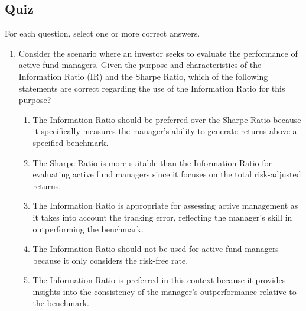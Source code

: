 \documentclass{article}
\begin{document}
\subsection{Quiz}
For each question, select one or more correct answers.

\begin{enumerate}
    \item Consider the scenario where an investor seeks to evaluate the performance of active fund managers. Given the purpose and characteristics of the Information Ratio (IR) and the Sharpe Ratio, which of the following statements are correct regarding the use of the Information Ratio for this purpose?
    \begin{enumerate}
        \item The Information Ratio should be preferred over the Sharpe Ratio because it specifically measures the manager's ability to generate returns above a specified benchmark.
        \item The Sharpe Ratio is more suitable than the Information Ratio for evaluating active fund managers since it focuses on the total risk-adjusted returns.
        \item The Information Ratio is appropriate for assessing active management as it takes into account the tracking error, reflecting the manager’s skill in outperforming the benchmark.
        \item The Information Ratio should not be used for active fund managers because it only considers the risk-free rate.
        \item The Information Ratio is preferred in this context because it provides insights into the consistency of the manager's outperformance relative to the benchmark.
    \end{enumerate}
    

\end{enumerate}
\end{document}
